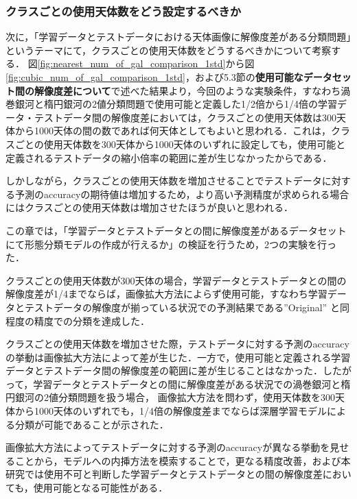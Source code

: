 \documentclass[a4j, 11pt]{jreport}
\begin{document}


\subsubsection{クラスごとの使用天体数をどう設定するべきか}
次に，「学習データとテストデータにおける天体画像に解像度差がある分類問題」というテーマにて，クラスごとの使用天体数をどうするべきかについて考察する．
図\ref{fig:nearest_num_of_gal_comparison_1std}から図\ref{fig:cubic_num_of_gal_comparison_1std}，および5.3節の\textbf{使用可能なデータセット間の解像度差について}で述べた結果より，今回のような実験条件，すなわち渦巻銀河と楕円銀河の2値分類問題で使用可能と定義した1/2倍から1/4倍の学習データ・テストデータ間の解像度差においては，クラスごとの使用天体数は300天体から1000天体の間の数であれば何天体としてもよいと思われる．これは，クラスごとの使用天体数を300天体から1000天体のいずれに設定しても，使用可能と定義されるテストデータの縮小倍率の範囲に差が生じなかったからである．

しかしながら，クラスごとの使用天体数を増加させることでテストデータに対する予測のaccuracyの期待値は増加するため，より高い予測精度が求められる場合にはクラスごとの使用天体数は増加させたほうが良いと思われる．

この章では，「学習データとテストデータとの間に解像度差があるデータセットにて形態分類モデルの作成が行えるか」の検証を行うため，2つの実験を行った．

クラスごとの使用天体数が300天体の場合，学習データとテストデータとの間の解像度差が1/4までならば，画像拡大方法によらず使用可能，すなわち学習データとテストデータの解像度が揃っている状況での予測結果である”Original” と同程度の精度での分類を達成した．

クラスごとの使用天体数を増加させた際，テストデータに対する予測のaccuracyの挙動は画像拡大方法によって差が生じた．一方で，使用可能と定義される学習データとテストデータ間の解像度差の範囲に差が生じることはなかった．したがって，学習データとテストデータとの間に解像度差がある状況での渦巻銀河と楕円銀河の2値分類問題を扱う場合，
画像拡大方法を問わず，使用天体数を300天体から1000天体のいずれでも，1/4倍の解像度差までならば深層学習モデルによる分類が可能であることが示された．

画像拡大方法によってテストデータに対する予測のaccuracyが異なる挙動を見せることから，モデルへの内挿方法を模索することで，更なる精度改善，および本研究では使用不可と判断した学習データとテストデータとの間の解像度差においても，使用可能となる可能性がある．
\end{document}
